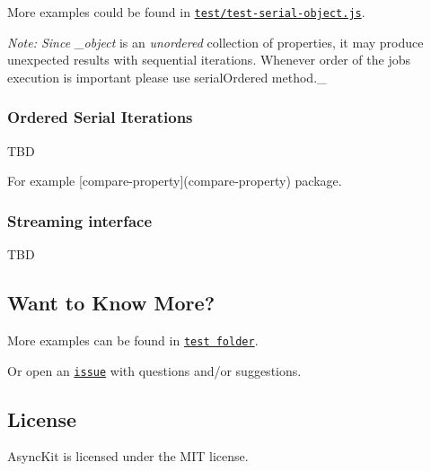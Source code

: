More examples could be found in \href{test/test-serial-object.js}{\tt test/test-\/serial-\/object.\+js}.

{\itshape Note\+: Since \+\_\+object} is an {\itshape unordered} collection of properties, it may produce unexpected results with sequential iterations. Whenever order of the jobs\textquotesingle{} execution is important please use {\ttfamily serial\+Ordered} method.\+\_\+

\subsubsection*{Ordered Serial Iterations}

T\+BD

For example \mbox{[}compare-\/property\mbox{]}(compare-\/property) package.

\subsubsection*{Streaming interface}

T\+BD

\subsection*{Want to Know More?}

More examples can be found in \href{test/}{\tt test folder}.

Or open an \href{https://github.com/alexindigo/asynckit/issues}{\tt issue} with questions and/or suggestions.

\subsection*{License}

Async\+Kit is licensed under the M\+IT license. 